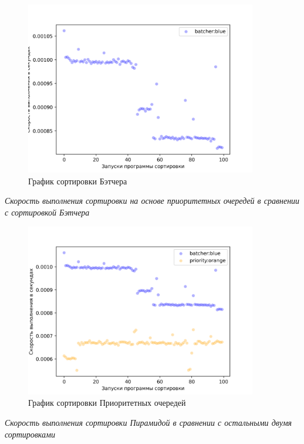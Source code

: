 \begin{figure}[H]
    \centering
    \includegraphics[width=0.9\textwidth]{./plots/batcher_speed.png}
    \caption{График сортировки Бэтчера}
\end{figure}


\textit{Скорость выполнения сортировки на основе приоритетных очередей в сравнении с сортировкой Бэтчера}

\begin{figure}[H]
    \centering
    \includegraphics[width=0.9\textwidth]{./plots/priority_speed.png}
    \caption{График сортировки Приоритетных очередей}
\end{figure}



\textit{Скорость выполнения сортировки Пирамидой в сравнении с остальными двумя сортировками}

